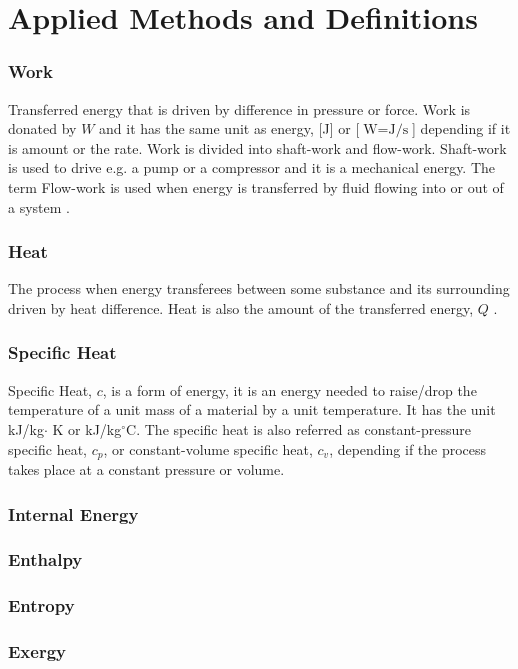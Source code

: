 \section{Applied Methods and Definitions}
\subsubsection*{Work}\label{app:work}
Transferred energy that is driven by difference in pressure or force. Work is donated by $W$ and it has the same unit as energy, [J] or [$\text{W}=\text{J/s}$] depending if it is amount or the rate. Work is divided into shaft-work and flow-work. Shaft-work is used to drive e.g. a pump or a compressor and it is a mechanical energy. The term Flow-work is used when energy is transferred by fluid flowing into or out of a system \citep{Dincer2010}.
\subsubsection*{Heat}\label{app:Heta}
The process when energy transferees between some substance and its surrounding driven by heat difference. Heat is also the amount of the transferred energy, $Q$ \citep{bib:Serway2014}.
\subsubsection*{Specific Heat}\label{app:spe_Heta}
Specific Heat, $c$, is a form of energy, it is an energy needed to raise/drop the temperature of a unit mass of a material by a unit temperature. It has the unit kJ/kg$\cdot$ K or kJ/kg$^\circ$C. The specific heat is also referred as constant-pressure specific heat, $c_p$, or constant-volume specific heat, $c_v$, depending if the process takes place at a constant pressure or volume.
\subsubsection*{Internal Energy}\label{app:int_energy}
\subsubsection*{Enthalpy}\label{app:Enthalpy}
\subsubsection*{Entropy}\label{app:Entropy}
\subsubsection*{Exergy}\label{app:Exergy}
